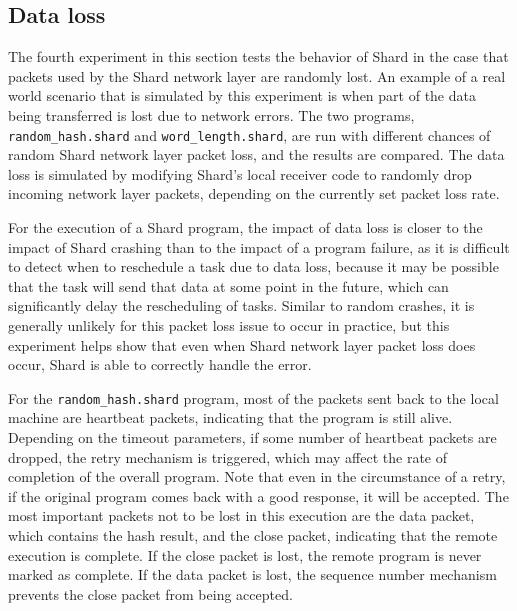 \documentclass[oneside]{report}
\begin{document}
\subsection{Data loss}
The fourth experiment in this section tests the behavior of Shard in the case that packets used by the Shard network layer are randomly lost.
An example of a real world scenario that is simulated by this experiment is when part of the data being transferred is lost due to network errors.
The two programs, \texttt{random\_hash.shard} and \texttt{word\_length.shard}, are run with different chances of random Shard network layer packet loss, and the results are compared.
The data loss is simulated by modifying Shard's local receiver code to randomly drop incoming network layer packets, depending on the currently set packet loss rate.

For the execution of a Shard program, the impact of data loss is closer to the impact of Shard crashing than to the impact of a program failure, as it is difficult to detect when to reschedule a task due to data loss, because it may be possible that the task will send that data at some point in the future, which can significantly delay the rescheduling of tasks.
Similar to random crashes, it is generally unlikely for this packet loss issue to occur in practice, but this experiment helps show that even when Shard network layer packet loss does occur, Shard is able to correctly handle the error.

For the \texttt{random\_hash.shard} program, most of the packets sent back to the local machine are heartbeat packets, indicating that the program is still alive.
Depending on the timeout parameters, if some number of heartbeat packets are dropped, the retry mechanism is triggered, which may affect the rate of completion of the overall program.
Note that even in the circumstance of a retry, if the original program comes back with a good response, it will be accepted.
The most important packets not to be lost in this execution are the data packet, which contains the hash result, and the close packet, indicating that the remote execution is complete.
If the close packet is lost, the remote program is never marked as complete.
If the data packet is lost, the sequence number mechanism prevents the close packet from being accepted.
\end{document}
